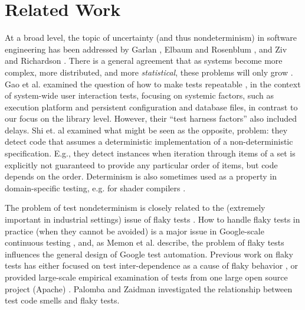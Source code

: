 \section{Related Work}

At a broad level, the topic of uncertainty (and thus nondeterminism) in software engineering has been addressed by Garlan \cite{GarlanUncertain}, Elbaum and Rosenblum \cite{Unknowns,lu2015roundtable}, and Ziv and Richardson \cite{UncertaintyPrinciple}.  There is a general agreement that as systems become more complex, more distributed, and more \emph{statistical}, these problems will only grow \cite{lu2015roundtable}.
Gao et al. examined the question of how to make tests repeatable \cite{Gao:2015:MSU:2818754.2818764}, in the context of system-wide user interaction tests, focusing on systemic factors, such as execution platform and persistent configuration and database files, in contrast to our focus on  the library level.  However, their ``test harness factors'' also included delays.
Shi et. al \cite{DetermImp} examined what might be seen as the opposite, problem:  they detect code that assumes a deterministic implementation of a non-deterministic specification.  E.g., they detect instances when  iteration through items of a set is explicitly not guaranteed to provide any particular order of items, but code depends on the order. Determinism is also sometimes used as a property in domain-specific testing, e.g. for shader compilers \cite{shader}.

The problem of test nondeterminism is closely related to the (extremely important in industrial settings) issue of flaky tests \cite{miccoflaky, luo2014empirical,palomba2017does,listfieldtestanalysis}.  How to handle flaky tests in practice (when they cannot be avoided) is a major issue in Google-scale continuous testing \cite{memon2017taming}, and, as Memon et al. describe, the problem of flaky tests influences the general design of Google test automation.
Previous work on flaky tests has either focused on test inter-dependence as a cause of flaky behavior \cite{LamZE2015}, or provided large-scale empirical examination of tests from one large open source project (Apache) \cite{luo2014empirical,palomba2017does}.  Palomba and Zaidman \cite{palomba2017does} investigated the relationship between test code smells and flaky tests.

